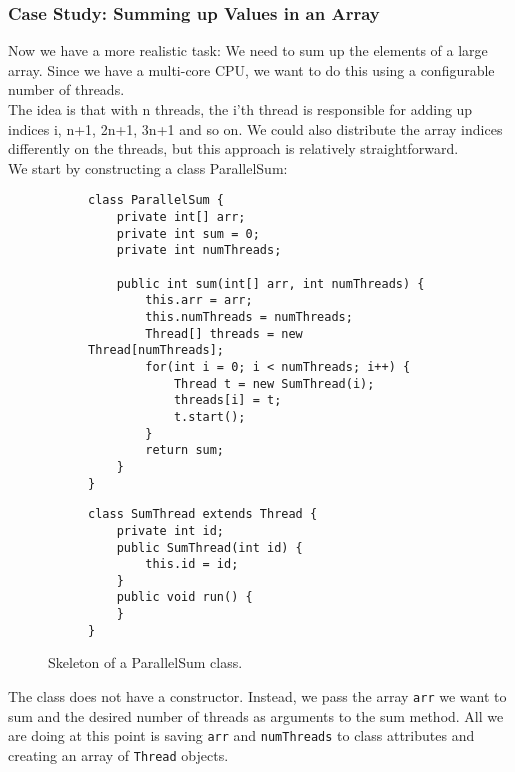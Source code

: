 \documentclass[main.tex]{subfiles}
\begin{document}
\subsubsection{Case Study: Summing up Values in an Array}
Now we have a more realistic task: We need to sum up the elements of a large array. Since we have a multi-core CPU, we want to do this using a configurable number of threads.\\[3mm]
The idea is that with n threads, the i'th thread is responsible for adding up indices i, n+1, 2n+1, 3n+1 and so on. We could also distribute the array indices differently on the threads, but this approach is relatively straightforward.\\
We start by constructing a class ParallelSum:
\begin{figure}[H]
    \begin{subfigure}[t]{.62\textwidth}
        \begin{verbatim}
class ParallelSum {
    private int[] arr;
    private int sum = 0;
    private int numThreads;

    public int sum(int[] arr, int numThreads) {
        this.arr = arr;
        this.numThreads = numThreads;
        Thread[] threads = new Thread[numThreads];
        for(int i = 0; i < numThreads; i++) {
            Thread t = new SumThread(i);
            threads[i] = t;
            t.start();
        }
        return sum;
    }
}
        \end{verbatim}
    \end{subfigure}%
    \begin{subfigure}[t]{.62\textwidth}
        \begin{verbatim}
class SumThread extends Thread {
    private int id;
    public SumThread(int id) {
        this.id = id;
    }
    public void run() {
    }
}
        \end{verbatim}
    \end{subfigure}
    \caption{Skeleton of a ParallelSum class.}
\end{figure}
The class does not have a constructor. Instead, we pass the array \texttt{arr} we want to sum and the desired number of threads as arguments to the sum method. All we are doing at this point is saving \texttt{arr} and \texttt{numThreads} to class attributes and creating an array of \texttt{Thread} objects.\\
\end{document}
